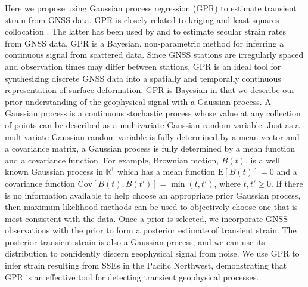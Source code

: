\documentclass[extra,mreferee]{gji}
\begin{document}
Here we propose using Gaussian process regression (GPR) \citep{Rasmussen2006} to estimate transient strain from GNSS data. GPR is closely related to kriging \citep{Cressie1992} and least squares collocation \citep{Moritz1978}. The latter has been used by \citet{Kato1998} and \citet{El-Fiky1999} to estimate secular strain rates from GNSS data. GPR is a Bayesian, non-parametric method for inferring a continuous signal from scattered data. Since GNSS stations are irregularly spaced and observation times may differ between stations, GPR is an ideal tool for synthesizing discrete GNSS data into a spatially and temporally continuous representation of surface deformation. GPR is Bayesian in that we describe our prior understanding of the geophysical signal with a Gaussian process. A Gaussian process is a continuous stochastic process whose value at any collection of points can be described as a multivariate Gaussian random variable. Just as a multivariate Gaussian random variable is fully determined by a mean vector and a covariance matrix, a Gaussian process is fully determined by a mean function and a covariance function. For example, Brownian motion, $B(t)$, is a well known Gaussian process in $\mathbb{R}^1$ which has a mean function $\mathrm{E}[B(t)] = 0$ and a covariance function $\mathrm{Cov}\left[B(t),B(t')\right] = \min(t,t')$, where $t,t' \ge 0$. If there is no information available to help choose an appropriate prior Gaussian process, then maximum likelihood methods can be used to objectively choose one that is most consistent with the data. Once a prior is selected, we incorporate GNSS observations with the prior to form a posterior estimate of transient strain.  The posterior transient strain is also a Gaussian process, and we can use its distribution to confidently discern geophysical signal from noise. We use GPR to infer strain resulting from SSEs in the Pacific Northwest, demonstrating that GPR is an effective tool for detecting transient geophysical processes. 
\end{document}
